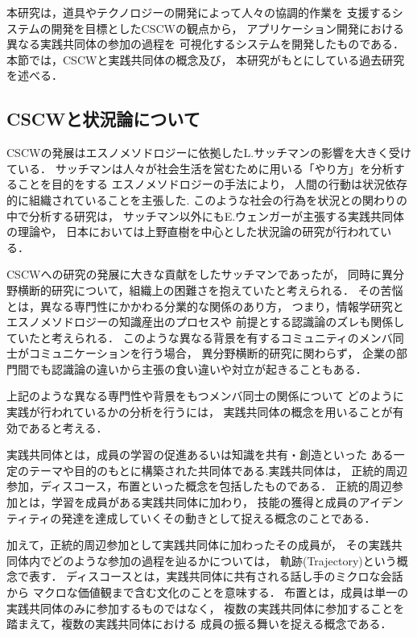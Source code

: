 \documentclass[submit,techrep]{ipsj}
\begin{document}
本研究は，道具やテクノロジーの開発によって人々の協調的作業を
支援するシステムの開発を目標としたCSCWの観点から\cite{book1}，
アプリケーション開発における異なる実践共同体の参加の過程を
可視化するシステムを開発したものである．本節では，CSCWと実践共同体の概念及び，
本研究がもとにしている過去研究を述べる．

\subsection{CSCWと状況論について}
CSCWの発展はエスノメソドロジーに依拠したL.サッチマンの影響を大きく受けている．
サッチマンは人々が社会生活を営むために用いる「やり方」を分析することを目的をする
エスノメソドロジー\cite{book2}の手法により，
人間の行動は状況依存的に組織されていることを主張した\cite{book3}.
このような社会の行為を状況との関わりの中で分析する研究は，
サッチマン以外にもE.ウェンガーが主張する実践共同体\cite{book4}の理論や，
日本においては上野直樹を中心とした状況論の研究が行われている\cite{book5}．

CSCWへの研究の発展に大きな貢献をしたサッチマンであったが，
同時に異分野横断的研究について，組織上の困難さを抱えていたと考えられる\cite{book6}．
その苦悩とは，異なる専門性にかかわる分業的な関係のあり方，
つまり，情報学研究とエスノメソドロジーの知識産出のプロセスや
前提とする認識論のズレも関係していたと考えられる\cite{book7}．
このような異なる背景を有するコミュニティのメンバ同士がコミュニケーションを行う場合，
異分野横断的研究に関わらず，
企業の部門間でも認識論の違いから主張の食い違いや対立が起きることもある\cite{book8}．

上記のような異なる専門性や背景をもつメンバ同士の関係について
どのように実践が行われているかの分析を行うには，
実践共同体の概念を用いることが有効であると考える．


実践共同体とは，成員の学習の促進あるいは知識を共有・創造といった
ある一定のテーマや目的のもとに構築された共同体である.実践共同体は，
正統的周辺参加，ディスコース，布置といった概念を包括したものである．
正統的周辺参加とは，学習を成員がある実践共同体に加わり，
技能の獲得と成員のアイデンティティの発達を達成していくその動きとして捉える概念のことである．


加えて，正統的周辺参加として実践共同体に加わったその成員が，
その実践共同体内でどのような参加の過程を辿るかについては，
軌跡(Trajectory)という概念で表す．
ディスコースとは，実践共同体に共有される話し手のミクロな会話から
マクロな価値観まで含む文化のことを意味する\cite{book9}．
布置とは，成員は単一の実践共同体のみに参加するものではなく，
複数の実践共同体に参加することを踏まえて，複数の実践共同体における
成員の振る舞いを捉える概念である\cite{book10}．
\end{document}

